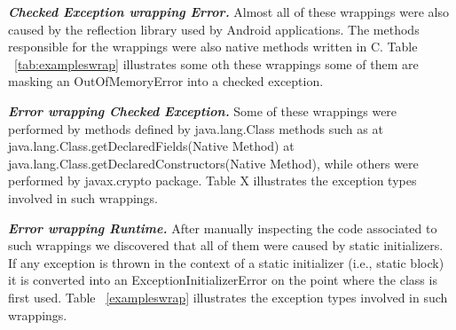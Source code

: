 \documentclass[conference]{IEEEtran}
\begin{document}
\emph{\textbf{Checked Exception wrapping Error.}} Almost all of these wrappings
 were also caused by the reflection library 
used by Android applications. The methods responsible for the wrappings
were also native methods written in C. Table ~\ref{tab:exampleswrap} illustrates
some oth these wrappings some of them are masking an OutOfMemoryError
into a checked exception.


\emph{\textbf{Error wrapping Checked Exception.}} Some of these wrappings were performed by methods defined by java.lang.Class methods such as 
at java.lang.Class.getDeclaredFields(Native Method)
at java.lang.Class.getDeclaredConstructors(Native Method), 
while others were performed by javax.crypto package. Table X illustrates
the exception types involved in such wrappings.


\emph{\textbf{Error wrapping Runtime.}} After manually inspecting the code associated to such wrappings 
we discovered that all of them were caused by static initializers. If any exception is thrown in the context of a static initializer (i.e., static block) 
it is converted into an ExceptionInitializerError on the point where the class is first used. Table ~\ref{exampleswrap} illustrates
the exception types involved in such wrappings.
\end{document}
